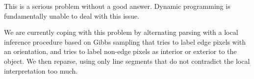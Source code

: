 

This is a serious problem without a good answer. Dynamic programming
is fundamentally unable to deal with this issue.  

We are currently coping with this problem by alternating parsing with
a local inference procedure based on Gibbs sampling that tries to
label edge pixels with an orientation, and tries to label non-edge
pixels as interior or exterior to the object. We then reparse, using
only line segments that do not contradict the local interpretation too
much.

